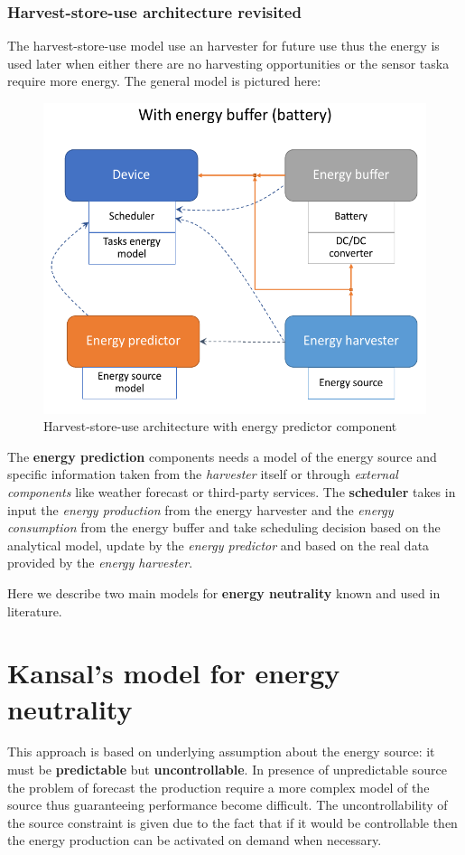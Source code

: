 \documentclass[10pt,a4paper]{report}
\theoremstyle{definition}
\begin{document}
\subsubsection{Harvest-store-use architecture revisited}\label{sec:harvest-store-use-architecture-revisited}
The harvest-store-use model use an harvester for future use thus the energy is used later when either there are no harvesting opportunities or the sensor taska require more energy. The general model is pictured here:
\begin{figure}[h]
	\centering\includegraphics[scale=0.30]{images/Pasted image 20230509151317.png}
	\caption{Harvest-store-use architecture with energy predictor component}
\end{figure}

The \textbf{energy prediction} components needs a model of the energy source and specific information taken from the \textit{harvester} itself or through \textit{external components} like weather forecast or third-party services.
The \textbf{scheduler} takes in input the \textit{energy production} from the energy harvester and the \textit{energy consumption} from the energy buffer and take scheduling decision based on the analytical model, update by the \textit{energy predictor} and based on the real data provided by the \textit{energy harvester}.

Here we describe two main models for \textbf{energy neutrality} known and used in literature.
\section{Kansal’s model for energy neutrality}\label{sec:kansals-approach}
This approach is based on underlying assumption about the energy source: it must be \textbf{predictable} but \textbf{uncontrollable}. In presence of unpredictable source the problem of forecast the production require a more complex model of the source thus guaranteeing performance become difficult.
The uncontrollability of the source constraint is given due to the fact that if it would be controllable then the energy production can be activated on demand when necessary.
\end{document}
